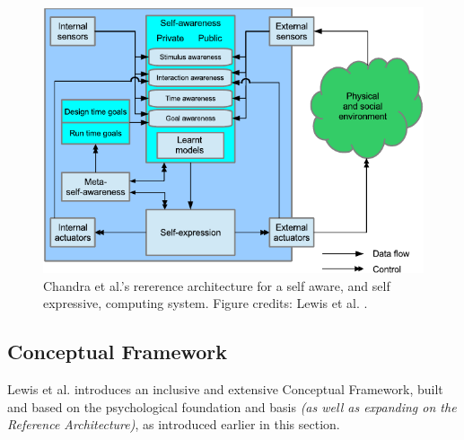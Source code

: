 	\begin{figure}[!htp]
		\centering
		\includegraphics[width=0.9\columnwidth]{Assets/DocSegments/Chapters/Background/Figures/Schema/SA_and_SE_architecture.pdf}
		\caption[A rererence architecture for a self aware, and self expressive, computing system.]{Chandra et al.'s \cite{sacs16_ch4} rererence architecture for a self aware, and self expressive, computing system. Figure credits: Lewis et al. \cite{sacs16_ch4}.}
	\end{figure}


	\subsection{Conceptual Framework}

	Lewis et al. \cite{sacs17_ch3} introduces an inclusive and extensive Conceptual Framework, built and based on the psychological foundation and basis \textit{(as well as expanding on the Reference Architecture)}, as introduced earlier in this section.

